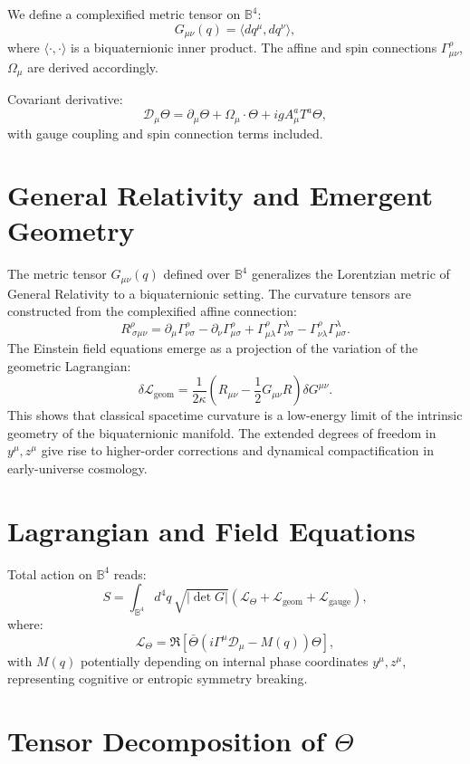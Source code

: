 \documentclass[12pt]{article}
\begin{document}
We define a complexified metric tensor on \( \mathbb{B}^4 \):
\[
G_{\mu\nu}(q) = \langle dq^\mu, dq^\nu \rangle,
\]
where \( \langle \cdot, \cdot \rangle \) is a biquaternionic inner product. The affine and spin connections \( \Gamma^\rho_{\mu\nu} \), \( \Omega_\mu \) are derived accordingly.

Covariant derivative:
\[
\mathcal{D}_\mu \Theta = \partial_\mu \Theta + \Omega_\mu \cdot \Theta + i g A_\mu^a T^a \Theta,
\]
with gauge coupling and spin connection terms included.


\section{General Relativity and Emergent Geometry}

The metric tensor \( G_{\mu\nu}(q) \) defined over \( \mathbb{B}^4 \) generalizes the Lorentzian metric of General Relativity to a biquaternionic setting. The curvature tensors are constructed from the complexified affine connection:
\[
R^\rho_{\ \sigma\mu\nu} = \partial_\mu \Gamma^\rho_{\nu\sigma} - \partial_\nu \Gamma^\rho_{\mu\sigma} + \Gamma^\rho_{\mu\lambda} \Gamma^\lambda_{\nu\sigma} - \Gamma^\rho_{\nu\lambda} \Gamma^\lambda_{\mu\sigma}.
\]
The Einstein field equations emerge as a projection of the variation of the geometric Lagrangian:
\[
\delta \mathcal{L}_{\text{geom}} = \frac{1}{2\kappa} \left( R_{\mu\nu} - \frac{1}{2} G_{\mu\nu} R \right) \delta G^{\mu\nu}.
\]
This shows that classical spacetime curvature is a low-energy limit of the intrinsic geometry of the biquaternionic manifold. The extended degrees of freedom in \( y^\mu, z^\mu \) give rise to higher-order corrections and dynamical compactification in early-universe cosmology.
\section{Lagrangian and Field Equations}

Total action on \( \mathbb{B}^4 \) reads:
\[
S = \int_{\mathbb{B}^4} d^4q \, \sqrt{|\det G|} \left( \mathcal{L}_{\Theta} + \mathcal{L}_{\text{geom}} + \mathcal{L}_{\text{gauge}} \right),
\]
where:
\[
\mathcal{L}_{\Theta} = \Re\left[ \bar{\Theta} \left( i \Gamma^\mu \mathcal{D}_\mu - M(q) \right) \Theta \right],
\]
with \( M(q) \) potentially depending on internal phase coordinates \( y^\mu, z^\mu \), representing cognitive or entropic symmetry breaking.

\section{Tensor Decomposition of \(\Theta\)}
\end{document}
